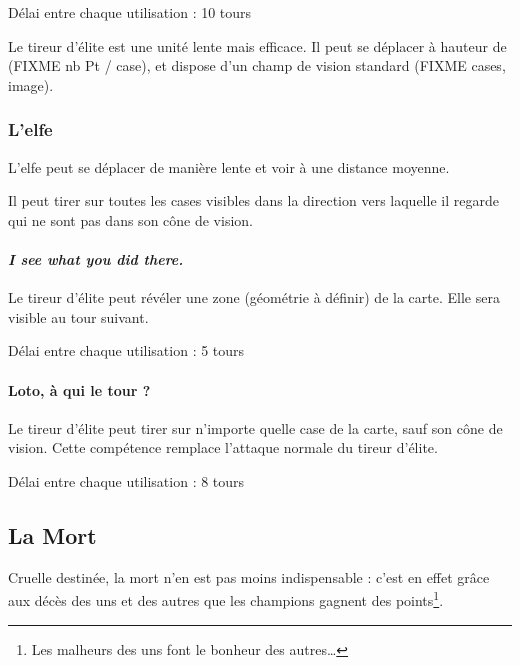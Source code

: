     Délai entre chaque utilisation : 10 tours


Le tireur d'élite est une unité lente mais efficace. Il peut se
déplacer à hauteur de (FIXME nb Pt / case), et dispose d'un champ de
vision standard (FIXME cases, image).

\subsubsection{L'elfe}

L'elfe peut se déplacer de manière lente et voir à une distance moyenne.

Il peut tirer sur toutes les cases visibles dans la direction vers laquelle il regarde qui ne sont pas dans son cône de vision.


\paragraph{\emph{I see what you did there.}} Le tireur d’élite peut révéler une zone (géométrie à définir) de la carte. Elle sera visible au tour suivant.

    Délai entre chaque utilisation : 5 tours

\paragraph{Loto, à qui le tour ?} Le tireur d’élite peut tirer sur n’importe quelle case de la carte, sauf son cône de vision. Cette compétence remplace l’attaque normale du tireur d’élite.

    Délai entre chaque utilisation : 8 tours

\subsection{La Mort}


Cruelle destinée, la mort n'en est pas moins indispensable : c'est en
effet grâce aux décès des uns et des autres que les champions gagnent
des points\footnote{Les malheurs des uns font le bonheur des autres\ldots{}}.\\

